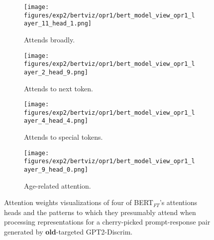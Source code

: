 \begin{figure}[H]
     \centering
     \begin{subfigure}[b]{0.22\textwidth}
        \centering
        \texttt{[image: figures/exp2/bertviz/opr1/bert\_model\_view\_opr1\_layer\_11\_head\_1.png]}
        \captionsetup{font=footnotesize,labelfont=footnotesize}
        \caption{Attends broadly.}
        \label{subfig:bertviz_model_view_opr1_broad}
     \end{subfigure}
     \quad
     \begin{subfigure}[b]{0.22\textwidth}
        \centering
        \texttt{[image: figures/exp2/bertviz/opr1/bert\_model\_view\_opr1\_layer\_2\_head\_9.png]}
        \captionsetup{font=footnotesize,labelfont=footnotesize}
        \caption{Attends to next token.}
        \label{subfig:bertviz_model_view_opr1_next}
     \end{subfigure}
    \quad
    \begin{subfigure}[b]{0.22\textwidth}
        \centering
        \texttt{[image: figures/exp2/bertviz/opr1/bert\_model\_view\_opr1\_layer\_4\_head\_4.png]}
        \captionsetup{font=footnotesize,labelfont=footnotesize}
        \caption{Attends to special tokens.}
        \label{subfig:bertviz_model_view_opr1_special}
     \end{subfigure}
    \quad
     \begin{subfigure}[b]{0.22\textwidth}
        \centering
        \texttt{[image: figures/exp2/bertviz/opr1/bert\_model\_view\_opr1\_layer\_9\_head\_0.png]}
        \captionsetup{font=footnotesize,labelfont=footnotesize}
        \caption{Age-related attention.}
        \label{subfig:bertviz_model_view_opr1_age}
     \end{subfigure}
    \caption{Attention weights visualizations of four of BERT$_{FT}$'s attentions heads and the patterns to which they presumably attend when processing representations for a cherry-picked prompt-response pair generated by \textbf{old}-targeted GPT2-Discrim.}
    \label{fig:bertviz_model_view_opr1}
\end{figure}

